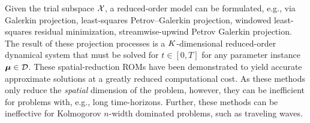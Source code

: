 \documentclass[3p,computermodern,10pt]{elsarticle}
\begin{document}
Given the trial subspace $\mathcal{X}$, a reduced-order model can be formulated, e.g., via Galerkin projection, least-squares Petrov--Galerkin projection, windowed least-squares residual minimization, streamwise-upwind Petrov Galerkin projection. The result of these projection processes is a $K$-dimensional reduced-order dynamical system that must be solved for $t \in [0,T]$ for any parameter instance $\boldsymbol \mu \in \mathcal{D}$. These spatial-reduction ROMs have been demonstrated to yield accurate approximate solutions at a greatly reduced computational cost. As these methods only reduce the \textit{spatial} dimension of the problem, however, they can be inefficient for problems with, e.g., long time-horizons. Further, these methods can be ineffective for Kolmogorov $n$-width dominated problems, such as traveling waves.  

\end{document}
